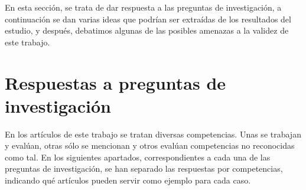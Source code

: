En esta sección, se trata de dar respuesta a las preguntas de investigación, a continuación se dan varias ideas que podrían ser extraídas de los resultados del estudio, y después, debatimos algunas de las posibles amenazas a la validez de este trabajo.


\section{Respuestas a preguntas de investigación}
En los artículos de este trabajo se tratan diversas competencias. Unas se trabajan y evalúan, otras sólo se mencionan y otros evalúan competencias no reconocidas como tal. En los siguientes apartados, correspondientes a cada una de las preguntas de investigación, se han separado las respuestas por competencias, indicando qué artículos pueden servir como ejemplo para cada caso. %

